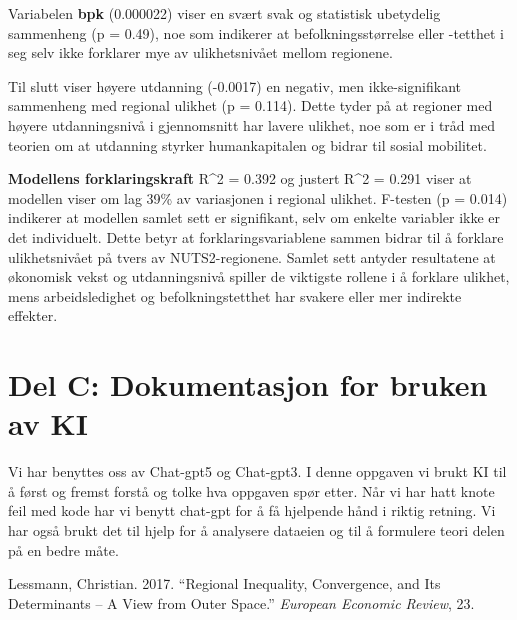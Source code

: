 \documentclass[
  letterpaper,
  DIV=11,
  numbers=noendperiod]{scrartcl}
\newlength{\cslhangindent}
\newenvironment{CSLReferences}[2] %
 {\begin{list}{}{%
  \setlength{\itemindent}{0pt}
  \setlength{\leftmargin}{0pt}
  \setlength{\parsep}{0pt}
  \ifodd #1
   \setlength{\leftmargin}{\cslhangindent}
   \setlength{\itemindent}{-1\cslhangindent}
  \fi
  \setlength{\itemsep}{#2\baselineskip}}}
 {\end{list}}
\begin{document}
Variabelen \textbf{bpk} (0.000022) viser en svært svak og statistisk
ubetydelig sammenheng (p = 0.49), noe som indikerer at
befolkningsstørrelse eller -tetthet i seg selv ikke forklarer mye av
ulikhetsnivået mellom regionene.

Til slutt viser høyere utdanning (-0.0017) en negativ, men
ikke-signifikant sammenheng med regional ulikhet (p = 0.114). Dette
tyder på at regioner med høyere utdanningsnivå i gjennomsnitt har lavere
ulikhet, noe som er i tråd med teorien om at utdanning styrker
humankapitalen og bidrar til sosial mobilitet.

\textbf{Modellens forklaringskraft} R\^{}2 = 0.392 og justert R\^{}2 =
0.291 viser at modellen viser om lag 39\% av variasjonen i regional
ulikhet. F-testen (p = 0.014) indikerer at modellen samlet sett er
signifikant, selv om enkelte variabler ikke er det individuelt. Dette
betyr at forklaringsvariablene sammen bidrar til å forklare
ulikhetsnivået på tvers av NUTS2-regionene. Samlet sett antyder
resultatene at økonomisk vekst og utdanningsnivå spiller de viktigste
rollene i å forklare ulikhet, mens arbeidsledighet og befolkningstetthet
har svakere eller mer indirekte effekter.

\section{Del C: Dokumentasjon for bruken av
KI}\label{del-c-dokumentasjon-for-bruken-av-ki}

Vi har benyttes oss av Chat-gpt5 og Chat-gpt3. I denne oppgaven vi brukt
KI til å først og fremst forstå og tolke hva oppgaven spør etter. Når vi
har hatt knote feil med kode har vi benytt chat-gpt for å få hjelpende
hånd i riktig retning. Vi har også brukt det til hjelp for å analysere
dataeien og til å formulere teori delen på en bedre måte.

\label{refs}
\begin{CSLReferences}{1}{0}
Lessmann, Christian. 2017. {``Regional Inequality, Convergence, and Its
Determinants -- {A} View from Outer Space.''} \emph{European
Economic Review}, 23.

\end{CSLReferences}
\end{document}
